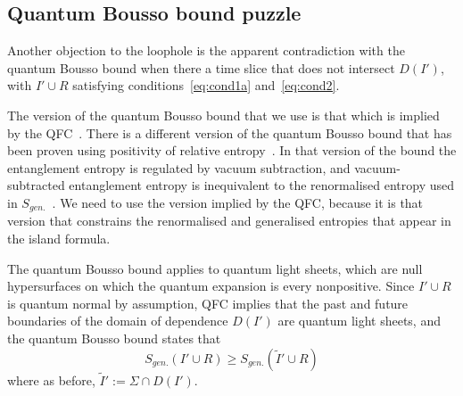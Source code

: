 \documentclass[a4paper,11pt]{article}
\def\bne{\begin{equation}}
\def\ene{\end{equation}}
\newcommand{\del}{\partial}
\begin{document}
\subsection{Quantum Bousso bound puzzle} \label{sec:Quantum_Bousso_bound}

Another objection to the loophole is the apparent contradiction with the quantum Bousso bound when there a time slice that does not intersect $D(I')$, with $I' \cup R$ satisfying conditions~\eqref{eq:cond1a} and~\eqref{eq:cond2}. 

The version of the quantum Bousso bound that we use is that which is implied by the QFC~\cite{Bousso2015}. There is a different version of the quantum Bousso bound that has been proven using positivity of relative entropy~\cite{Casini2008, Bousso2014}. In that version of the bound the entanglement entropy is regulated by vacuum subtraction, and vacuum-subtracted entanglement entropy is inequivalent to the renormalised entropy used in $S_{gen.}$~\cite{Bousso2014, Bousso2015}. We need to use the version implied by the QFC, because it is that version that constrains the renormalised and generalised entropies that appear in the island formula.

The quantum Bousso bound applies to quantum light sheets, which are null hypersurfaces on which the quantum expansion is every nonpositive. Since $I'\cup R$ is quantum normal by assumption, QFC implies that the past and future boundaries of the domain of dependence $D(I')$ are quantum light sheets, and the quantum Bousso bound states that~\cite{Strominger2003}
\bne \label{eq:qBoussoBound} S_{gen.}(I' \cup R) \geq S_{gen.} (\tilde I ' \cup R)
\ene
where as before, $\tilde{I}' := \Sigma \cap D(I')$. 
\end{document}
